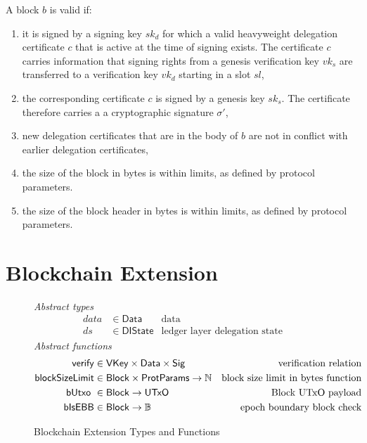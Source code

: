 \documentclass[11pt,a4paper]{article}
\newcommand{\var}[1]{\mathit{#1}}
\newcommand{\fun}[1]{\mathsf{#1}}
\newcommand{\type}[1]{\mathsf{#1}}
\newcommand{\Block}{\type{Block}}
\newcommand{\VKey}{\type{VKey}}
\newcommand{\Sig}{\type{Sig}}
\newcommand{\Data}{\type{Data}}
\newcommand{\DelegState}{\type{DIState}}
\newcommand{\ProtParams}{\type{ProtParams}} %
\newcommand{\verifyname}{verify}
\newcommand{\blocksizelimitname}{blockSizeLimit}
\newcommand{\isebbname}{bIsEBB}
\newcommand{\totalf}{\to}
\begin{document}
A block $\var{b}$ is valid if:
%
\begin{enumerate}
\item it is signed by a signing key $sk_d$ for which a valid heavyweight
  delegation certificate $c$ that is active at the time of signing exists.
  The certificate $c$ carries information that signing rights from a
  genesis verification key $vk_s$ are transferred to a verification key $vk_d$
  starting in a slot $sl$,
\item the corresponding certificate $c$ is signed by a genesis key $sk_s$. The
  certificate therefore carries a a cryptographic signature $\sigma'$,
\item new delegation certificates that are in the body of $b$ are not in
  conflict with earlier delegation certificates,
\item the size of the block in bytes is within limits, as defined by
  protocol parameters.
\item the size of the block header in bytes is within limits, as defined by
  protocol parameters.
\end{enumerate}

\clearpage

\section{Blockchain Extension}
\label{sec:chain-extension}

\newcommand{\CEEnv}{\type{CEEnv}}
\newcommand{\CEState}{\type{CEState}}

\newcommand{\butxo}[1]{\fun{bUtxo}\ #1}

\newcommand{\UTxO}{\type{UTxO}}
\newcommand{\DIEnv}{\type{DIEnv}}
\newcommand{\DIState}{\type{DIState}}

\newcommand{\UPIEnv}{\type{UPIEnv}}
\newcommand{\UPIState}{\type{UPIState}}

\begin{figure}[ht]
  \emph{Abstract types}
  \begin{align*}
    \var{data} & \in \Data    & \text{data}\\
    \var{ds} & \in \DelegState & \text{ledger layer delegation state}
  \end{align*}
  \emph{Abstract functions}
  \begin{align*}
    \fun{\verifyname} & \in \VKey \times \Data \times \Sig
      & \text{verification relation} \\
    \fun{\blocksizelimitname} & \in \Block \times \ProtParams \totalf \mathbb{N}
      & \text{block size limit in bytes function} \\
    \butxo & \in \Block \totalf \UTxO & \text{Block UTxO payload} \\
    \fun{\isebbname} & \in \Block \totalf \mathbb{B} & \text{epoch boundary block check}
  \end{align*}
  \caption{Blockchain Extension Types and Functions}
  \label{fig:defs:chain-extension}
\end{figure}
\end{document}
